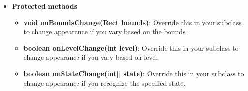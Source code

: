 \documentclass{report}
\begin{document}
\begin{itemize}
        \item \textbf{Protected methods}
            \begin{itemize}
                \item \textbf{void onBoundsChange(Rect bounds)}: Override this in your subclass to change appearance if you vary based on the bounds.
                \item \textbf{boolean onLevelChange(int level)}: Override this in your subclass to change appearance if you vary based on level.
                \item \textbf{boolean onStateChange(int[] state)}: Override this in your subclass to change appearance if you recognize the specified state.
            \end{itemize}
    \end{itemize}

    \pagebreak 
\end{document}
